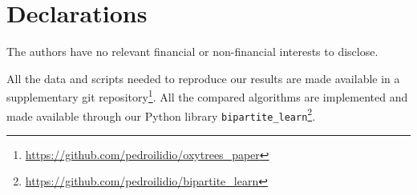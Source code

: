\documentclass[sn-mathphys-num]{sn-jnl}%
\theoremstyle{thmstyleone}%
\theoremstyle{thmstyletwo}%
\theoremstyle{thmstylethree}%
\begin{document}
%
%
%

%



\FloatBarrier
\backmatter

\section*{Declarations}

The authors have no relevant financial or non-financial interests to disclose.

\label{sec:availability}
All the data and scripts needed to reproduce our results are made available in a supplementary git repository\footnote{\url{https://github.com/pedroilidio/oxytrees_paper}}.  
%
All the compared algorithms are implemented and made available through our Python library \texttt{bipartite\_learn}\footnote{\url{ https://github.com/pedroilidio/bipartite_learn}}.  
\end{document}
